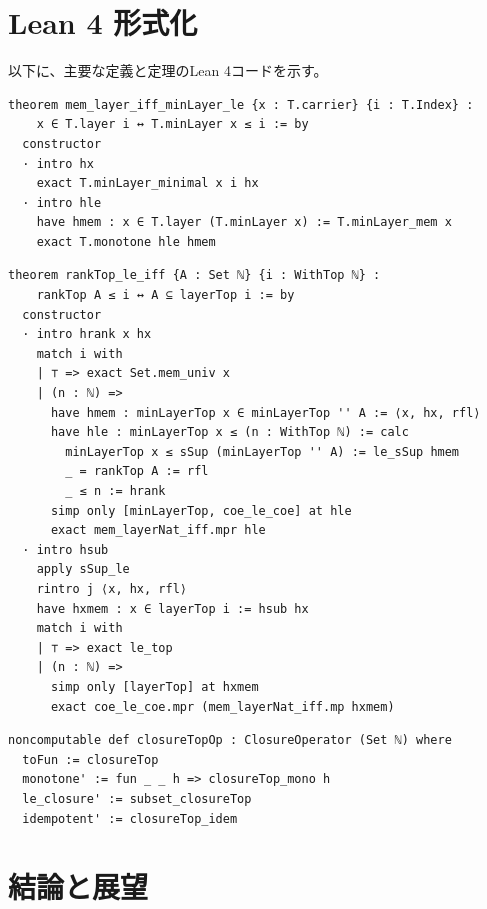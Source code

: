 \documentclass[a4paper,11pt]{ltjsarticle}
\theoremstyle{definition}
\begin{document}
\section{Lean 4 形式化}\label{sec:lean}

以下に、主要な定義と定理のLean 4コードを示す。

\begin{leanbox}[正規形補題]
\begin{verbatim}
theorem mem_layer_iff_minLayer_le {x : T.carrier} {i : T.Index} :
    x ∈ T.layer i ↔ T.minLayer x ≤ i := by
  constructor
  · intro hx
    exact T.minLayer_minimal x i hx
  · intro hle
    have hmem : x ∈ T.layer (T.minLayer x) := T.minLayer_mem x
    exact T.monotone hle hmem
\end{verbatim}
\end{leanbox}

\begin{leanbox}
\begin{verbatim}
theorem rankTop_le_iff {A : Set ℕ} {i : WithTop ℕ} :
    rankTop A ≤ i ↔ A ⊆ layerTop i := by
  constructor
  · intro hrank x hx
    match i with
    | ⊤ => exact Set.mem_univ x
    | (n : ℕ) =>
      have hmem : minLayerTop x ∈ minLayerTop '' A := ⟨x, hx, rfl⟩
      have hle : minLayerTop x ≤ (n : WithTop ℕ) := calc
        minLayerTop x ≤ sSup (minLayerTop '' A) := le_sSup hmem
        _ = rankTop A := rfl
        _ ≤ n := hrank
      simp only [minLayerTop, coe_le_coe] at hle
      exact mem_layerNat_iff.mpr hle
  · intro hsub
    apply sSup_le
    rintro j ⟨x, hx, rfl⟩
    have hxmem : x ∈ layerTop i := hsub hx
    match i with
    | ⊤ => exact le_top
    | (n : ℕ) =>
      simp only [layerTop] at hxmem
      exact coe_le_coe.mpr (mem_layerNat_iff.mp hxmem)
\end{verbatim}
\end{leanbox}

\begin{leanbox}[閉包演算子インスタンス]
\begin{verbatim}
noncomputable def closureTopOp : ClosureOperator (Set ℕ) where
  toFun := closureTop
  monotone' := fun _ _ h => closureTop_mono h
  le_closure' := subset_closureTop
  idempotent' := closureTop_idem
\end{verbatim}
\end{leanbox}

\section{結論と展望}
\end{document}
